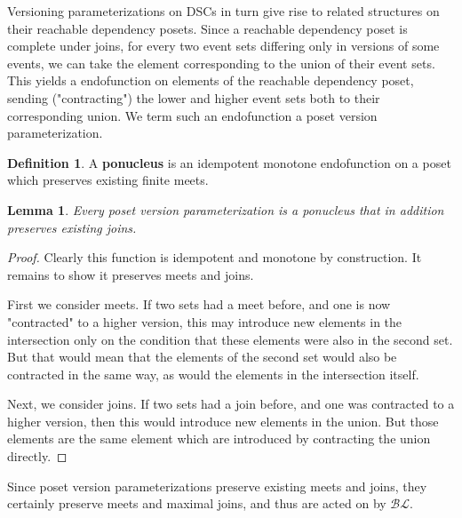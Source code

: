 \documentclass[hoptionsi,review,format=acmsmall]{acmart}
\newtheorem{lemma}[theorem]{Lemma}
\theoremstyle{definition}
\newtheorem{definition}{Definition}[section]
\newcommand{\BLc}{\mathcal{BL}}
\begin{document}

Versioning parameterizations on DSCs in turn give rise to related structures on their reachable dependency posets. Since a reachable dependency poset is complete under joins, for every two event sets differing only in versions of some events, we can take the element corresponding to the union of their event sets. This yields a  endofunction on elements of the reachable dependency poset, sending ("contracting") the lower and higher event sets both to their corresponding union. We term such an endofunction a poset version parameterization.

\begin{definition}
A \textbf{ponucleus} is an idempotent monotone endofunction on a poset which preserves existing finite meets.
\end{definition}

\begin{lemma}
Every poset version parameterization is a ponucleus that in addition preserves existing joins.
\end{lemma}

\begin{proof}
Clearly this function is idempotent and monotone by construction. It remains to show it preserves meets and joins.

First we consider meets. If two sets had a meet before, and one is now "contracted" to a higher version, this may introduce new elements in the intersection only on the condition that these elements were also in the second set. But that would mean that the elements of the second set would also be contracted in the same way, as would the elements in the intersection itself.

Next, we consider joins. If two sets had a join before, and one was contracted to a higher version, then this would introduce new elements in the union. But those elements are the same element which are introduced by contracting the union directly.
\end{proof}

Since poset version parameterizations preserve existing meets and joins, they certainly preserve meets and maximal joins, and thus are acted on by \(\BLc\).
\end{document}
